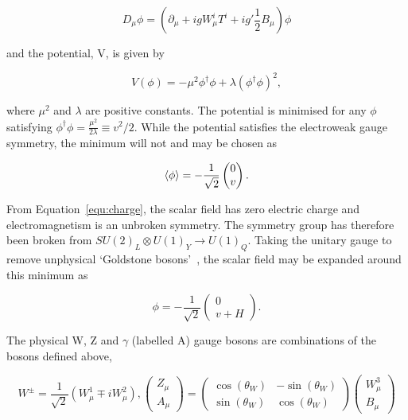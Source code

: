 \begin{equation}
D_{\mu} \phi = (\partial_\mu + igW^i_{\mu}T^i + ig'\frac{1}{2}B_\mu)\phi 
\end{equation}

\noindent and the potential, V, is given by

\begin{equation}
V(\phi) =  - \mu^2\phi^{\dagger}\phi + \lambda \left(\phi^{\dagger}\phi\right)^2,
\end{equation}

\noindent where $\mu^2$ and $\lambda$ are positive constants. The potential is minimised for any $\phi$ satisfying
$\phi^{\dagger}\phi = \frac{\mu^2}{2\lambda} \equiv v^2/2$. While the potential satisfies the 
electroweak gauge symmetry, the minimum will not and may be chosen as

\begin{equation}
\braket{\phi} =  - \frac{1}{\sqrt{2}}\begin{pmatrix} 0 \\ v\end{pmatrix}.
\end{equation}

\noindent From Equation~\ref{equ:charge}, the scalar field has zero electric charge and electromagnetism
is an unbroken symmetry. The symmetry group has therefore been broken 
from $SU(2)_L\otimes U(1)_Y \rightarrow U(1)_Q$. Taking the unitary gauge to remove unphysical `Goldstone 
bosons'~\cite{unitGauge}, the scalar field may be expanded around this minimum as

\begin{equation}
\label{equ:phiExp}
\phi =  - \frac{1}{\sqrt{2}}\begin{pmatrix} 0 \\ v + H\end{pmatrix}.
\end{equation}

\noindent The physical W, Z and $\gamma$ (labelled A) gauge bosons are combinations of the 
bosons defined above,

\begin{equation}
W^{\pm} = \frac{1}{\sqrt{2}} (W^1_\mu \mp i W^2_\mu), \begin{pmatrix} Z_\mu \\ A_\mu\end{pmatrix} = \begin{pmatrix} \cos(\theta_W) & -\sin(\theta_W) \\ \sin(\theta_W) & \cos(\theta_W)\end{pmatrix} \begin{pmatrix} W^3_\mu \\ B_\mu\end{pmatrix}
\end{equation}


